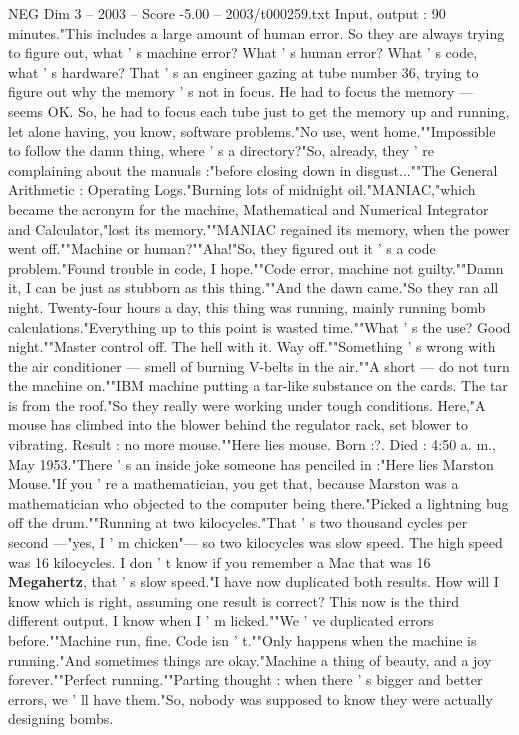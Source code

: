 \begin{textsample}{NEG Dim 3 – 2003 – Score -5.00 – 2003/t000259.txt}
Input, output : 90 minutes."This includes a large amount of human error.
So they are always trying to figure out, what ' s machine error?
What ' s human error?
What ' s code, what ' s hardware?
That ' s an engineer gazing at tube number 36, trying to figure out why the memory ' s not in focus.
He had to focus the memory — seems OK.
So, he had to focus each tube just to get the memory up and running, let alone having, you know, software problems."No use, went home.""Impossible to follow the damn thing, where ' s a directory?"So, already, they ' re complaining about the manuals :"before closing down in disgust...""The General Arithmetic : Operating Logs."Burning lots of midnight oil."MANIAC,"which became the acronym for the machine, Mathematical and Numerical Integrator and Calculator,"lost its memory.""MANIAC regained its memory, when the power went off.""Machine or human?""Aha!"So, they figured out it ' s a code problem."Found trouble in code, I hope.""Code error, machine not guilty.""Damn it, I can be just as stubborn as this thing.""And the dawn came."So they ran all night.
Twenty-four hours a day, this thing was running, mainly running bomb calculations."Everything up to this point is wasted time.""What ' s the use?
Good night.""Master control off.
The hell with it.
Way off.""Something ' s wrong with the air conditioner — smell of burning V-belts in the air.""A short — do not turn the machine on.""IBM machine putting a tar-like substance on the cards.
The tar is from the roof."So they really were working under tough conditions.
Here,"A mouse has climbed into the blower behind the regulator rack, set blower to vibrating.
Result : no more mouse.""Here lies mouse.
Born :?.
Died : 4:50 a. m., May 1953."There ' s an inside joke someone has penciled in :"Here lies Marston Mouse."If you ' re a mathematician, you get that, because Marston was a mathematician who objected to the computer being there."Picked a lightning bug off the drum.""Running at two kilocycles."That ' s two thousand cycles per second —"yes, I ' m chicken"— so two kilocycles was slow speed.
The high speed was 16 kilocycles.
I don ' t know if you remember a Mac that was 16 \textbf{Megahertz}, that ' s slow speed."I have now duplicated both results.
How will I know which is right, assuming one result is correct?
This now is the third different output.
I know when I ' m licked.""We ' ve duplicated errors before.""Machine run, fine.
Code isn ' t.""Only happens when the machine is running."And sometimes things are okay."Machine a thing of beauty, and a joy forever.""Perfect running.""Parting thought : when there ' s bigger and better errors, we ' ll have them."So, nobody was supposed to know they were actually designing bombs.

\end{textsample}
